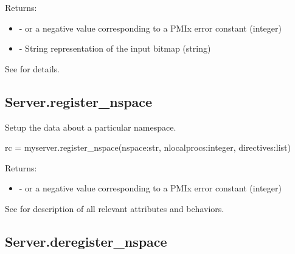 Returns:

\begin{itemize}
    \item {} -  or a negative value corresponding to a PMIx error constant (integer)
    \item {} - String representation of the input bitmap (string)
\end{itemize}

See  for details.


\subsection{Server.register_nspace}

\summary Setup the data about a particular namespace.

\format

\pyspecificstart
\begin{codepar}
rc = myserver.register_nspace(nspace:str,
                              nlocalprocs:integer,
                              directives:list)
\end{codepar}
\pyspecificend


\begin{arglist}
\end{arglist}

Returns:

\begin{itemize}
    \item {} -  or a negative value corresponding to a PMIx error constant (integer)
\end{itemize}

See  for description of all relevant attributes and behaviors.


\subsection{Server.deregister_nspace}

